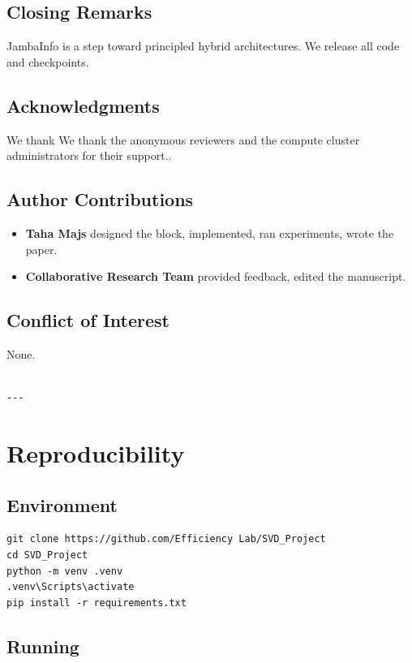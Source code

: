 \subsection{Closing Remarks}

JambaInfo is a step toward principled hybrid architectures. We release 
all code and checkpoints.

\subsection{Acknowledgments}

We thank We thank the anonymous reviewers and the compute cluster administrators for their support..

\subsection{Author Contributions}

\begin{itemize}
\item \textbf{Taha Majs} designed the block, implemented, ran experiments, wrote
  the paper.
\item \textbf{Collaborative Research Team} provided feedback, edited the manuscript.

\end{itemize}
\subsection{Conflict of Interest}

None.
\begin{lstlisting}

---
\end{lstlisting}

\section{Reproducibility}

\subsection{Environment}

\begin{lstlisting}
git clone https://github.com/Efficiency Lab/SVD_Project
cd SVD_Project
python -m venv .venv
.venv\Scripts\activate
pip install -r requirements.txt
\end{lstlisting}

\subsection{Running}

